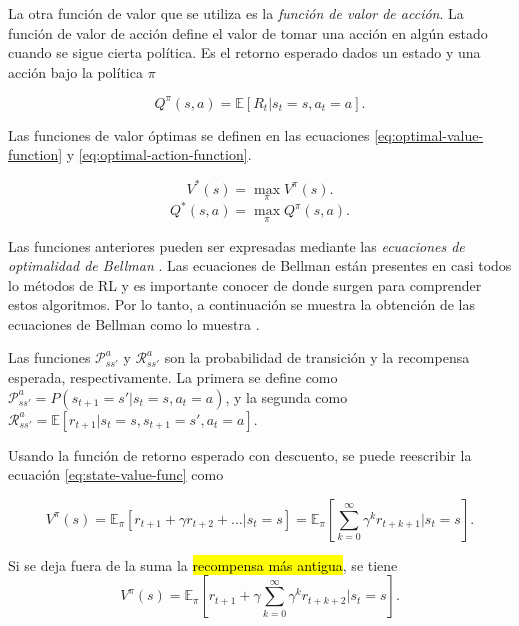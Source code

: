 La otra función de valor que se utiliza es la \textit{función de valor de acción}.
La función de valor de acción define el valor de 
tomar una acción en algún estado cuando se sigue cierta política. Es el
retorno esperado dados un estado y una acción bajo la política $\pi$

\begin{equation}\label{eq:action-value-func}
Q^\pi (s,a) = \mathbb{E}[R_t | s_t = s, a_t = a].    
\end{equation}

Las funciones de valor óptimas se definen en las ecuaciones \ref{eq:optimal-value-function}
y \ref{eq:optimal-action-function}.

\begin{equation}
\label{eq:optimal-value-function}
V^*(s) = \max_{\pi} V^\pi(s).
\end{equation}
\begin{equation}
\label{eq:optimal-action-function}
    Q^*(s, a) = \max_{\pi} Q^\pi (s,a).
\end{equation}


Las funciones anteriores pueden ser expresadas mediante las \textit{ecuaciones de optimalidad de Bellman} \cite{bellman1966dynamic}.
Las ecuaciones de Bellman están presentes en casi todos lo métodos de RL y es importante conocer de donde surgen para comprender estos algoritmos. Por lo tanto, a continuación se muestra la obtención de las ecuaciones
de Bellman como lo muestra \cite{greaves}.

Las funciones $\mathcal{P}_{ss'}^a$ y $\mathcal{R}_{ss'}^a$ son la probabilidad de transición y la recompensa esperada, respectivamente. La primera se define como
$\mathcal{P}_{ss'}^a = P(s_{t+1} = s' | s_t = s, a_t = a)$,
y la segunda como
$\mathcal{R}_{ss'}^a = \mathbb{E}[r_{t+1} | s_t = s, s_{t+1} = s', a_t = a]$.

Usando la función de retorno esperado con descuento, se puede
reescribir la ecuación \ref{eq:state-value-func} como

\begin{equation}
V^\pi(s) = \mathbb{E}_\pi[r_{t+1} + \gamma r_{t+2} + \dots | s_t = s] = \mathbb{E}_{\pi}[\sum_{k = 0}^\infty \gamma^{k} r_{t+k+1} | s_t =s].
\end{equation}


Si se deja fuera de la suma la \hl{recompensa más antigua}, se tiene
\begin{equation}
V^\pi(s) = \mathbb{E}_\pi[r_{t+1} + \gamma \sum_{k = 0}^\infty \gamma^{k} r_{t+k+2} | s_t =s].
\end{equation}

